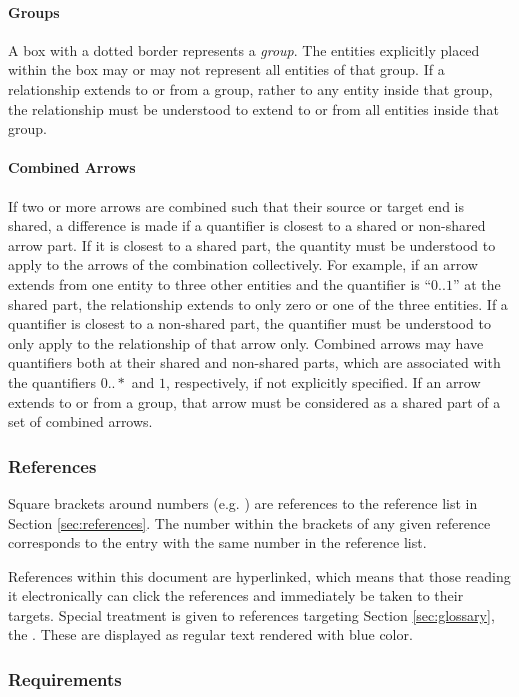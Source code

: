 \paragraph{Groups}
A box with a dotted border represents a \textit{group}.
The entities explicitly placed within the box may or may not represent all entities of that group.
If a relationship extends to or from a group, rather to any entity inside that group, the relationship must be understood to extend to or from all entities inside that group.

\paragraph{Combined Arrows}
If two or more arrows are combined such that their source or target end is shared, a difference is made if a quantifier is closest to a shared or non-shared arrow part.
If it is closest to a shared part, the quantity must be understood to apply to the arrows of the combination collectively.
For example, if an arrow extends from one entity to three other entities and the quantifier is ``$0..1$'' at the shared part, the relationship extends to only zero or one of the three entities.
If a quantifier is closest to a non-shared part, the quantifier must be understood to only apply to the relationship of that arrow only.
Combined arrows may have quantifiers both at their shared and non-shared parts, which are associated with the quantifiers $0..*$ and $1$, respectively, if not explicitly specified.
If an arrow extends to or from a group, that arrow must be considered as a shared part of a set of combined arrows.

\subsubsection{References}

Square brackets around numbers (e.g. \cite{delsing2017iot}) are references to the reference list in Section \ref{sec:references}.
The number within the brackets of any given reference corresponds to the entry with the same number in the reference list.

References within this document are hyperlinked, which means that those reading it electronically can click the references and immediately be taken to their targets.
Special treatment is given to references targeting Section \ref{sec:glossary}, the .
These are displayed as regular text rendered with blue color.

\subsubsection{Requirements}

